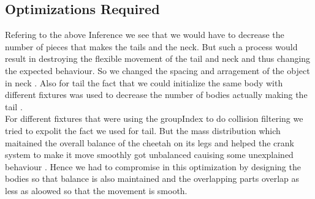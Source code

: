 \documentclass[11pt]{article}
\begin{document}
\subsection{Optimizations Required}
Refering to the above Inference we see that we would have to decrease the number of pieces that makes the tails and the neck. 
But such a process would result in destroying the flexible movement of the tail and neck and thus changing the expected behaviour.
So we changed the spacing and arragement of the object in neck . Also for tail the fact that we could initialize the same body with
different fixtures was used to decrease the number of bodies actually making the tail .\\
For different fixtures that were using the groupIndex to do collision filtering we tried to expolit the fact we used for tail.
But the mass distribution which maitained the overall balance of the cheetah on its legs and helped the crank system to make it move smoothly
got unbalanced cauising some unexplained behaviour . Hence we had to compromise in this optimization by designing the bodies so that balance 
is also maintained and the overlapping parts overlap as less as aloowed so that the movement is smooth. 




\end{document}
